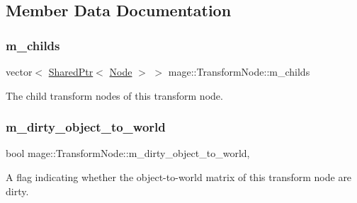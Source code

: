 \subsection{Member Data Documentation}
\hypertarget{structmage_1_1_transform_node_ae26b5d4c920a3743354b6f28c8b41651}{}\label{structmage_1_1_transform_node_ae26b5d4c920a3743354b6f28c8b41651} 
\subsubsection{\texorpdfstring{m\+\_\+childs}{m\_childs}}
{\footnotesize\ttfamily vector$<$ \hyperlink{namespacemage_a1e01ae66713838a7a67d30e44c67703e}{Shared\+Ptr}$<$ \hyperlink{classmage_1_1_node}{Node} $>$ $>$ mage\+::\+Transform\+Node\+::m\+\_\+childs\hspace{0.3cm}{\ttfamily [private]}}

The child transform nodes of this transform node. \hypertarget{structmage_1_1_transform_node_a389151fddc72499d0be4e725622d99b9}{}\label{structmage_1_1_transform_node_a389151fddc72499d0be4e725622d99b9} 
\subsubsection{\texorpdfstring{m\+\_\+dirty\+\_\+object\+\_\+to\+\_\+world}{m\_dirty\_object\_to\_world}}
{\footnotesize\ttfamily bool mage\+::\+Transform\+Node\+::m\+\_\+dirty\+\_\+object\+\_\+to\+\_\+world\hspace{0.3cm}{\ttfamily [mutable]}, {\ttfamily [private]}}

A flag indicating whether the object-\/to-\/world matrix of this transform node are dirty. \hypertarget{structmage_1_1_transform_node_acb9046e0096ada337e1978f016daa144}{}\label{structmage_1_1_transform_node_acb9046e0096ada337e1978f016daa144} 
